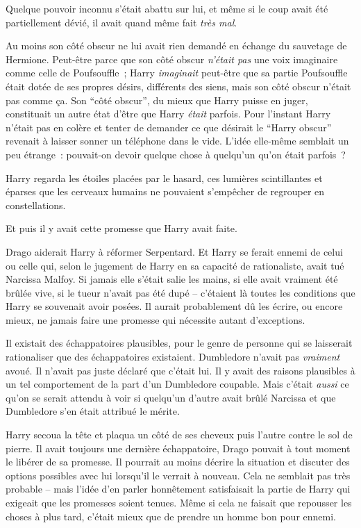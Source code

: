 Quelque pouvoir inconnu s'était abattu sur lui, et même si le coup avait été partiellement dévié, il avait quand même fait \emph{très mal}.

Au moins son côté obscur ne lui avait rien demandé en échange du sauvetage de Hermione.
Peut-être parce que son côté obscur \emph{n'était pas} une voix imaginaire comme celle de Poufsouffle~; Harry \emph{imaginait} peut-être que sa partie Poufsouffle était dotée de ses propres désirs, différents des siens, mais son côté obscur n'était pas comme ça.
Son “côté obscur”, du mieux que Harry puisse en juger, constituait un autre état d'être que Harry \emph{était} parfois.
Pour l'instant Harry n'était pas en colère et tenter de demander ce que désirait le “Harry obscur” revenait à laisser sonner un téléphone dans le vide.
L'idée elle-même semblait un peu étrange~: pouvait-on devoir quelque chose à quelqu'un qu'on était parfois~?

Harry regarda les étoiles placées par le hasard, ces lumières scintillantes et éparses que les cerveaux humains ne pouvaient s'empêcher de regrouper en constellations.

Et puis il y avait cette promesse que Harry avait faite.

Drago aiderait Harry à réformer Serpentard.
Et Harry se ferait ennemi de celui ou celle qui, selon le jugement de Harry en sa capacité de rationaliste, avait tué Narcissa Malfoy.
Si jamais elle s'était salie les mains, si elle avait vraiment été brûlée vive, si le tueur n'avait pas été dupé -- c'étaient là toutes les conditions que Harry se souvenait avoir posées.
Il aurait probablement dû les écrire, ou encore mieux, ne jamais faire une promesse qui nécessite autant d'exceptions.

Il existait des échappatoires plausibles, pour le genre de personne qui se laisserait rationaliser que des échappatoires existaient.
Dumbledore n'avait pas \emph{vraiment} avoué.
Il n'avait pas juste déclaré que c'était lui.
Il y avait des raisons plausibles à un tel comportement de la part d'un Dumbledore coupable.
Mais c'était \emph{aussi} ce qu'on se serait attendu à voir si quelqu'un d'autre avait brûlé Narcissa et que Dumbledore s'en était attribué le mérite.

Harry secoua la tête et plaqua un côté de ses cheveux puis l'autre contre le sol de pierre.
Il avait toujours une dernière échappatoire, Drago pouvait à tout moment le libérer de sa promesse.
Il pourrait au moins décrire la situation et discuter des options possibles avec lui lorsqu'il le verrait à nouveau.
Cela ne semblait pas très probable -- mais l'idée d'en parler honnêtement satisfaisait la partie de Harry qui exigeait que les promesses soient tenues.
Même si cela ne faisait que repousser les choses à plus tard, c'était mieux que de prendre un homme bon pour ennemi.

